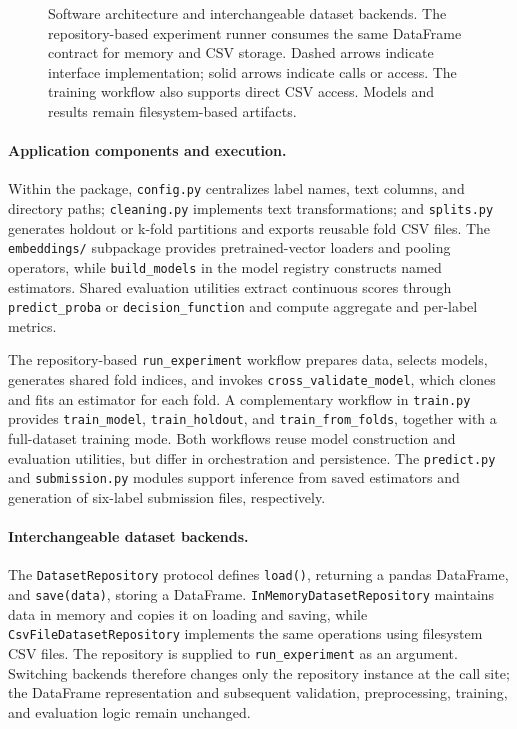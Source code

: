 \begin{figure}[t]
{%
}
\caption{Software architecture and interchangeable dataset backends. The repository-based experiment runner consumes the same DataFrame contract for memory and CSV storage. Dashed arrows indicate interface implementation; solid arrows indicate calls or access. The training workflow also supports direct CSV access. Models and results remain filesystem-based artifacts.}
\label{fig:software-architecture}
\end{figure}

\paragraph{Application components and execution.}
Within the package, \texttt{config.py} centralizes label names, text columns, and directory paths; \texttt{cleaning.py} implements text transformations; and \texttt{splits.py} generates holdout or k-fold partitions and exports reusable fold CSV files. The \texttt{embeddings/} subpackage provides pretrained-vector loaders and pooling operators, while \texttt{build\_models} in the model registry constructs named estimators. Shared evaluation utilities extract continuous scores through \texttt{predict\_proba} or \texttt{decision\_function} and compute aggregate and per-label metrics.

The repository-based \texttt{run\_experiment} workflow prepares data, selects models, generates shared fold indices, and invokes \texttt{cross\_validate\_model}, which clones and fits an estimator for each fold. A complementary workflow in \texttt{train.py} provides \texttt{train\_model}, \texttt{train\_holdout}, and \texttt{train\_from\_folds}, together with a full-dataset training mode. Both workflows reuse model construction and evaluation utilities, but differ in orchestration and persistence. The \texttt{predict.py} and \texttt{submission.py} modules support inference from saved estimators and generation of six-label submission files, respectively.

\paragraph{Interchangeable dataset backends.}
The \texttt{DatasetRepository} protocol defines \texttt{load()}, returning a pandas DataFrame, and \texttt{save(data)}, storing a DataFrame. \texttt{InMemoryDatasetRepository} maintains data in memory and copies it on loading and saving, while \texttt{CsvFileDatasetRepository} implements the same operations using filesystem CSV files. The repository is supplied to \texttt{run\_experiment} as an argument. Switching backends therefore changes only the repository instance at the call site; the DataFrame representation and subsequent validation, preprocessing, training, and evaluation logic remain unchanged.

